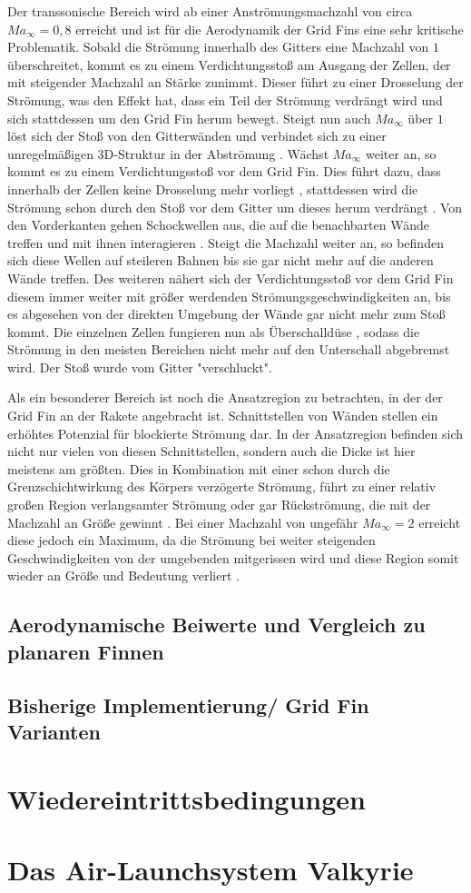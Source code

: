 Der transsonische Bereich wird ab einer Anströmungsmachzahl von circa $Ma_\infty=0,8$ erreicht \cite{machgrenzen} und ist für die Aerodynamik der Grid Fins eine sehr kritische Problematik. Sobald die Strömung innerhalb des Gitters eine Machzahl von $1$ überschreitet, kommt es zu einem Verdichtungsstoß am Ausgang der Zellen, der mit steigender Machzahl an Stärke zunimmt. Dieser führt zu einer Drosselung der Strömung, was den Effekt hat, dass ein Teil der Strömung verdrängt wird und sich stattdessen um den Grid Fin herum bewegt. Steigt nun auch $Ma_\infty$ über $1$ löst sich der Stoß von den Gitterwänden und verbindet sich zu einer unregelmäßigen 3D-Struktur in der Abströmung \cite{stroemung}. Wächst $Ma_\infty$ weiter an, so kommt es zu einem Verdichtungsstoß vor dem Grid Fin. Dies führt dazu, dass innerhalb der Zellen keine Drosselung mehr vorliegt \cite{stroemung}, stattdessen wird die Strömung schon durch den Stoß vor dem Gitter um dieses herum verdrängt \cite{synopsis}. Von den Vorderkanten gehen Schockwellen aus, die auf die benachbarten Wände treffen und mit ihnen interagieren \cite{synopsis}. Steigt die Machzahl weiter an, so befinden sich diese Wellen auf steileren Bahnen bis sie gar nicht mehr auf die anderen Wände treffen. Des weiteren nähert sich der Verdichtungsstoß vor dem Grid Fin diesem immer weiter mit größer werdenden Strömungsgeschwindigkeiten an, bis es abgesehen von der direkten Umgebung der Wände gar nicht mehr zum Stoß kommt. Die einzelnen Zellen fungieren nun als Überschalldüse \cite{stroemung}, sodass die Strömung in den meisten Bereichen nicht mehr auf den Unterschall abgebremst wird. Der Stoß wurde vom Gitter "verschluckt".

Als ein besonderer Bereich ist noch die Ansatzregion zu betrachten, in der der Grid Fin an der Rakete angebracht ist. Schnittstellen von Wänden stellen ein erhöhtes Potenzial für blockierte Strömung dar. In der Ansatzregion befinden sich nicht nur vielen von diesen Schnittstellen, sondern auch die Dicke ist hier meistens am größten. Dies in Kombination mit einer schon durch die Grenzschichtwirkung des Körpers verzögerte Strömung, führt zu einer relativ großen Region verlangsamter Strömung oder gar Rückströmung, die mit der Machzahl an Größe gewinnt \cite{stroemung}. Bei einer Machzahl von ungefähr $Ma_\infty = 2$ erreicht diese jedoch ein Maximum, da die Strömung bei weiter steigenden Geschwindigkeiten von der umgebenden mitgerissen wird und diese Region somit wieder an Größe und Bedeutung verliert \cite{stroemung}.
\subsection{Aerodynamische Beiwerte und Vergleich zu planaren Finnen}
\subsection{Bisherige Implementierung/ Grid Fin Varianten}

\section{Wiedereintrittsbedingungen}

\section{Das Air-Launchsystem Valkyrie}

